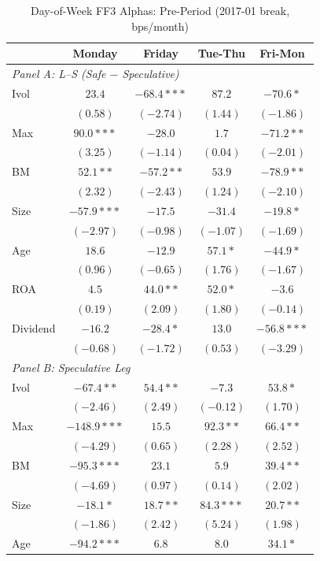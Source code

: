 \begin{table}[htbp]
\centering
\caption{Day-of-Week FF3 Alphas: Pre-Period (2017-01 break, bps/month)}
\label{tab:split_ff3_201701_pre_ff3}
\footnotesize
\begin{tabular}{l c c c c}
\toprule
 & Monday & Friday & Tue-Thu & Fri-Mon \\
\midrule
\multicolumn{5}{l}{\textit{Panel A: L--S (Safe $-$ Speculative)}} \\
Ivol & $23.4$ & $-68.4***$ & $87.2$ & $-70.6*$ \\
 & $(0.58)$ & $(-2.74)$ & $(1.44)$ & $(-1.86)$ \\
Max & $90.0***$ & $-28.0$ & $1.7$ & $-71.2**$ \\
 & $(3.25)$ & $(-1.14)$ & $(0.04)$ & $(-2.01)$ \\
BM & $52.1**$ & $-57.2**$ & $53.9$ & $-78.9**$ \\
 & $(2.32)$ & $(-2.43)$ & $(1.24)$ & $(-2.10)$ \\
Size & $-57.9***$ & $-17.5$ & $-31.4$ & $-19.8*$ \\
 & $(-2.97)$ & $(-0.98)$ & $(-1.07)$ & $(-1.69)$ \\
Age & $18.6$ & $-12.9$ & $57.1*$ & $-44.9*$ \\
 & $(0.96)$ & $(-0.65)$ & $(1.76)$ & $(-1.67)$ \\
ROA & $4.5$ & $44.0**$ & $52.0*$ & $-3.6$ \\
 & $(0.19)$ & $(2.09)$ & $(1.80)$ & $(-0.14)$ \\
Dividend & $-16.2$ & $-28.4*$ & $13.0$ & $-56.8***$ \\
 & $(-0.68)$ & $(-1.72)$ & $(0.53)$ & $(-3.29)$ \\
\midrule
\multicolumn{5}{l}{\textit{Panel B: Speculative Leg}} \\
Ivol & $-67.4**$ & $54.4**$ & $-7.3$ & $53.8*$ \\
 & $(-2.46)$ & $(2.49)$ & $(-0.12)$ & $(1.70)$ \\
Max & $-148.9***$ & $15.5$ & $92.3**$ & $66.4**$ \\
 & $(-4.29)$ & $(0.65)$ & $(2.28)$ & $(2.52)$ \\
BM & $-95.3***$ & $23.1$ & $5.9$ & $39.4**$ \\
 & $(-4.69)$ & $(0.97)$ & $(0.14)$ & $(2.02)$ \\
Size & $-18.1*$ & $18.7**$ & $84.3***$ & $20.7**$ \\
 & $(-1.86)$ & $(2.42)$ & $(5.24)$ & $(1.98)$ \\
Age & $-94.2***$ & $6.8$ & $8.0$ & $34.1*$ \\

\end{tabular}
\end{table}
